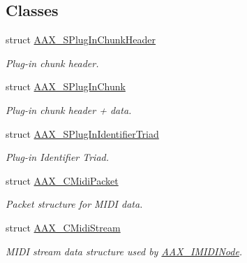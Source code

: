 \subsection*{Classes}
\begin{DoxyCompactItemize}
\item 
struct \mbox{\hyperlink{a01417}{A\+A\+X\+\_\+\+S\+Plug\+In\+Chunk\+Header}}
\begin{DoxyCompactList}\small\item\em Plug-\/in chunk header. \end{DoxyCompactList}\item 
struct \mbox{\hyperlink{a01421}{A\+A\+X\+\_\+\+S\+Plug\+In\+Chunk}}
\begin{DoxyCompactList}\small\item\em Plug-\/in chunk header + data. \end{DoxyCompactList}\item 
struct \mbox{\hyperlink{a01425}{A\+A\+X\+\_\+\+S\+Plug\+In\+Identifier\+Triad}}
\begin{DoxyCompactList}\small\item\em Plug-\/in Identifier Triad. \end{DoxyCompactList}\item 
struct \mbox{\hyperlink{a01429}{A\+A\+X\+\_\+\+C\+Midi\+Packet}}
\begin{DoxyCompactList}\small\item\em Packet structure for M\+I\+DI data. \end{DoxyCompactList}\item 
struct \mbox{\hyperlink{a01433}{A\+A\+X\+\_\+\+C\+Midi\+Stream}}
\begin{DoxyCompactList}\small\item\em M\+I\+DI stream data structure used by \mbox{\hyperlink{a01845}{A\+A\+X\+\_\+\+I\+M\+I\+D\+I\+Node}}. \end{DoxyCompactList}\end{DoxyCompactItemize}
